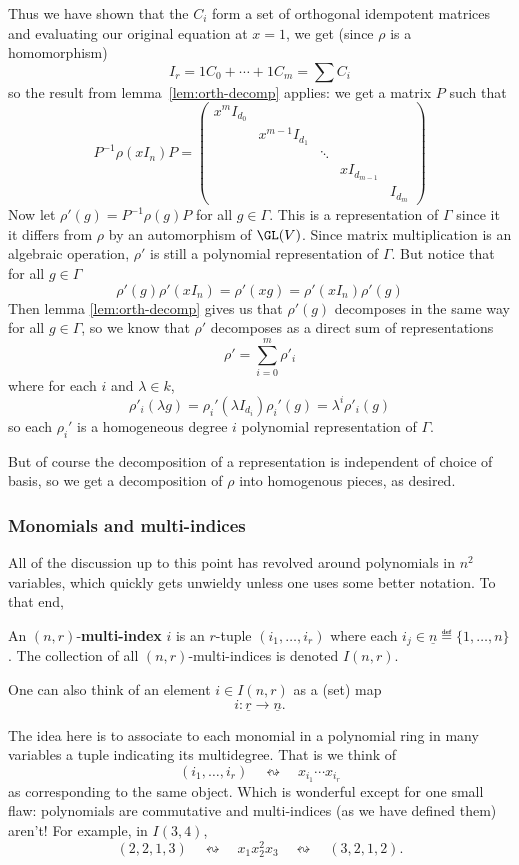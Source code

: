 \documentclass[12pt]{article}
\begin{document}
\begin{prf}
	Thus we have shown that the $C_i$ form a set of orthogonal idempotent matrices and evaluating our original equation at $x=1$,
	we get (since $\rho$ is a homomorphism)
	\[I_r=1C_0+\cdots+1C_m=\sum C_i\]
	so the result from lemma~\ref{lem:orth-decomp} applies: we get a matrix $P$ such that 
	\[P^{-1}\rho(xI_n)P=\begin{pmatrix}
		x^mI_{d_0} & & & &\\
		& x^{m-1}I_{d_1} & & &\\
		& & \ddots & &\\
		& & & xI_{d_{m-1}} & \\
		& & & & I_{d_m}
	\end{pmatrix}\]
	Now let $\rho'(g)=P^{-1}\rho (g)P$ for all $g\in\Gamma$. This is a representation of $\Gamma$ since it it differs from $\rho$ by 
	an automorphism of $\GL(V)$. Since matrix multiplication is an algebraic operation, $\rho'$ is still a polynomial representation of $\Gamma$. 
	But notice that for all $g\in\Gamma$
	\[\rho'(g)\rho'(xI_n)=\rho'(xg)=\rho'(xI_n)\rho'(g)\]
	Then lemma \ref{lem:orth-decomp} gives us that $\rho'(g)$ decomposes in the same way for all $g\in \Gamma$, so 
	we know that $\rho'$ decomposes as a direct sum of representations 
	\[\rho'=\sum_{i=0}^m \rho'_i\]
	where for each $i$ and $\lambda\in k$,
	\[\rho'_i(\lambda g)=\rho_i'(\lambda I_{d_i})\rho_i'(g)=\lambda^i\rho'_i(g)\]
	so each $\rho_i'$ is a homogeneous degree $i$ polynomial representation of $\Gamma$.

	But of course the decomposition of a representation is independent of choice of basis,
	so we get a decomposition of $\rho$ into homogenous pieces, as desired.
\end{prf}

\subsubsection{Monomials and multi-indices}\label{subsubsec:indices}
All of the discussion up to this point has revolved around polynomials in $n^2$ variables, which quickly gets unwieldy unless one 
uses some better notation. To that end, 
\begin{defn}
	An $(n,r)$-\textbf{multi-index} $i$ is an $r$-tuple $(i_1,\dots,i_r)$ where each $i_j\in\underline n\eqdef\{1,\dots,n\}$.
	The collection of all $(n,r)$-multi-indices is denoted $I(n,r)$.
\end{defn}
\begin{rmk}
	One can also think of an element $i\in I(n,r)$ as a (set) map 
	\[i:\underline r\to\underline n.\]
\end{rmk}
The idea here is to associate to each monomial in a polynomial ring in many variables a tuple indicating its multidegree. That is we think of 
\[(i_1,\dots,i_r)\quad\leftrightsquigarrow\quad x_{i_1}\cdots x_{i_r}\]
as corresponding to the same object. Which is wonderful except for one small flaw: polynomials are commutative 
and multi-indices (as we have defined them) aren't! For example, in $I(3,4)$,
\[(2,2,1,3)\quad\leftrightsquigarrow\quad x_1x_2^2x_3\quad\leftrightsquigarrow\quad (3,2,1,2).\]
\end{document}
